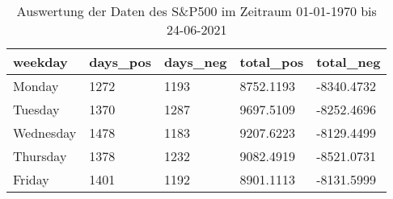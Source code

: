 \begin{table}[hbt]
    \centering
    \begin{minipage}[t]{1\textwidth} %
        \caption{Auswertung der Daten des S\&P500 im Zeitraum 01-01-1970 bis 24-06-2021} %
        \begin{tabular}{|l|l|l|l|l|}
            \hline
            \textbf{weekday} & \textbf{days\_pos} & \textbf{days\_neg} & \textbf{total\_pos} & \textbf{total\_neg} \\ \hline
            Monday           & 1272               & 1193               & 8752.1193           & -8340.4732          \\ \hline
            Tuesday          & 1370               & 1287               & 9697.5109           & -8252.4696          \\ \hline
            Wednesday        & 1478               & 1183               & 9207.6223           & -8129.4499          \\ \hline
            Thursday         & 1378               & 1232               & 9082.4919           & -8521.0731          \\ \hline
            Friday           & 1401               & 1192               & 8901.1113           & -8131.5999          \\ \hline
        \end{tabular}
        \label{tab:ausw_sp500}
    \end{minipage}
\end{table}

\clearpage